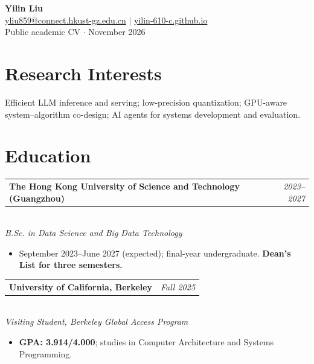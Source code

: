 \documentclass[10pt,a4paper]{article}
\makeatletter
\newcommand{\entry}[3]{%
  \begin{tabularx}{\textwidth}{@{}Xr@{}}
    \textbf{#1} & \textit{#2}
  \end{tabularx}\\[-1pt]
  \textit{#3}
}
\makeatother
\begin{document}
\begin{center}
  {\LARGE\bfseries Yilin Liu}\\[3pt]
  \href{mailto:yliu859@connect.hkust-gz.edu.cn}{yliu859@connect.hkust-gz.edu.cn}
  \quad $\vert$ \quad
  \href{https://yilin-610-c.github.io/}{yilin-610-c.github.io}\\[2pt]
  {\small Public academic CV $\cdot$ November 2026}
\end{center}
\vspace{-6pt}

\section*{Research Interests}
Efficient LLM inference and serving; low-precision quantization; GPU-aware system--algorithm co-design; AI agents for systems development and evaluation.

\section*{Education}
\entry{The Hong Kong University of Science and Technology (Guangzhou)}{2023--2027}
{B.Sc. in Data Science and Big Data Technology}
\begin{itemize}
  \item September 2023--June 2027 (expected); final-year undergraduate. \textbf{Dean's List for three semesters.}
\end{itemize}
\entry{University of California, Berkeley}{Fall 2025}
{Visiting Student, Berkeley Global Access Program}
\begin{itemize}
  \item \textbf{GPA: 3.914/4.000}; studies in Computer Architecture and Systems Programming.
\end{itemize}
\end{document}
